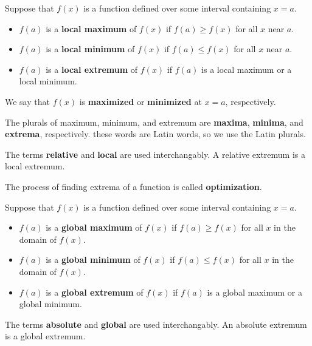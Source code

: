\begin{definition}
    Suppose that $f(x)$ is a function defined over some interval containing $x=a$. 
    \begin{itemize}[label={}]
    \item $f(a)$ is a {\bf local maximum} of $f(x)$ if $f(a)\ge f(x)$ for all $x$ near $a$.
    \item $f(a)$ is a {\bf local minimum} of $f(x)$ if $f(a)\le f(x)$ for all $x$ near $a$.
    \item $f(a)$ is a {\bf local extremum} of $f(x)$ if $f(a)$ is a local maximum or a local minimum.
    \end{itemize}
We say that $f(x)$ is {\bf maximized} or {\bf minimized} at $x=a$, respectively.
\end{definition}
\begin{note}
The plurals of maximum, minimum, and extremum are {\bf maxima}, {\bf minima}, and {\bf extrema}, respectively. these words are Latin words, so we use the Latin plurals.
\end{note}
\begin{note}
The terms {\bf relative} and {\bf local} are used interchangably. A relative extremum is a local extremum.
\end{note}
\begin{definition}[Optimization]
The process of finding extrema of a function is called {\bf optimization}.
\end{definition}

\begin{definition}
    Suppose that $f(x)$ is a function defined over some interval containing $x=a$.
    \begin{itemize}[label={}]
    \item $f(a)$ is a {\bf global maximum} of $f(x)$ if $f(a)\ge f(x)$ for all $x$ in the domain of $f(x)$.
    \item $f(a)$ is a {\bf global minimum} of $f(x)$ if $f(a)\le f(x)$ for all $x$ in the domain of $f(x)$.
    \item $f(a)$ is a {\bf global extremum} of $f(x)$ if $f(a)$ is a global maximum or a global minimum.
    \end{itemize}
\end{definition}
\begin{note}
The terms {\bf absolute} and {\bf global} are used interchangably. An absolute extremum is a global extremum.
\end{note}

